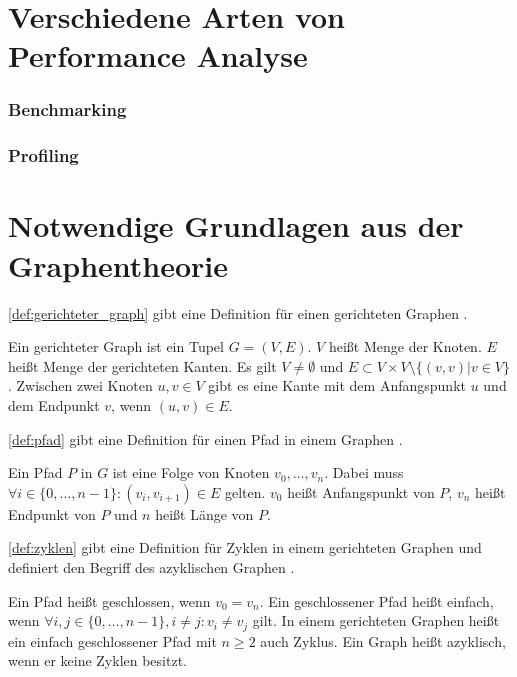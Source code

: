 
\section{Verschiedene Arten von Performance Analyse}
\label{sec:arten_performance_analyse}
\subsubsection*{Benchmarking}
\subsubsection*{Profiling}


\section{Notwendige Grundlagen aus der Graphentheorie}
\label{sec:grundlagen_graphentheorie}

\autoref{def:gerichteter_graph} gibt eine Definition für einen gerichteten
Graphen \autocite[Vgl.][S.220]{AlgorithmenUndDatenstrukturen}.
\begin{definition}
    Ein gerichteter Graph ist ein Tupel $G=(V,E)$. $V$ heißt Menge der Knoten.
    $E$ heißt Menge der gerichteten Kanten. Es gilt $V\ne\emptyset$ und $E \subset V \times
    V \setminus \{(v,v) | v \in V\}$. Zwischen zwei Knoten $u,v \in V$ gibt es
    eine Kante mit dem Anfangspunkt $u$ und dem Endpunkt $v$, wenn $(u,v) \in E$.
    \label{def:gerichteter_graph}
\end{definition}

\autoref{def:pfad} gibt eine Definition für einen Pfad in einem Graphen
\autocite[Vgl.][S.221f]{AlgorithmenUndDatenstrukturen}.
\begin{definition}
    Ein Pfad $P$ in $G$  ist eine Folge von Knoten $v_0, \dots ,v_n$. Dabei
    muss $\forall i \in \{0, \dots, n-1 \} : (v_i,v_{i+1}) \in E$ gelten. $v_0$
    heißt Anfangspunkt von $P$, $v_n$ heißt Endpunkt von $P$ und $n$ heißt
    Länge von $P$.
    \label{def:pfad}
\end{definition}

\autoref{def:zyklen} gibt  eine Definition für Zyklen in einem gerichteten
Graphen und definiert den Begriff des azyklischen Graphen
\autocite[Vgl.][S.222]{AlgorithmenUndDatenstrukturen}.
\begin{definition}
    Ein Pfad heißt geschlossen, wenn $v_0 = v_n$. Ein
    geschlossener Pfad heißt einfach, wenn $\forall i,j \in \{0,\dots,n-1\}, i
    \ne j:v_i \ne v_j$ gilt. In einem gerichteten Graphen heißt ein einfach
    geschlossener Pfad mit $n\geq 2$ auch Zyklus. Ein Graph heißt azyklisch,
    wenn er keine Zyklen besitzt.
    \label{def:zyklen}
\end{definition}

